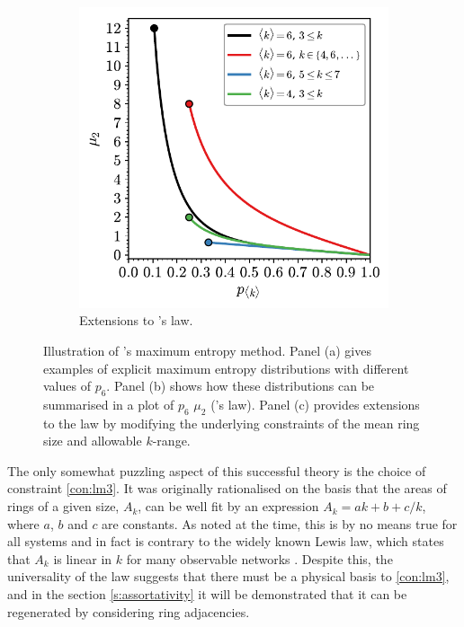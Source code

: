 \begin{figure}[bt]
      \begin{subfigure}[b]{0.45\textwidth}
         \centering
         \includegraphics[width=\textwidth]{./figures/methods/lm_3.pdf}
         \caption{Extensions to \lm's law.}
         \label{fig:lm3}
     \end{subfigure}
     \hfill

    
     \caption{Illustration of \lm's maximum entropy method. Panel (a) gives examples of explicit maximum entropy distributions with different values of $p_6$. Panel (b) shows how these distributions can be summarised in a plot of $p_6$ \vs{} $\mu_2$ (\lm's law). Panel (c) provides extensions to the law by modifying the underlying constraints of the mean ring size and allowable $k$\--range.}
     \label{fig:lm}
\end{figure}

The only somewhat puzzling aspect of this successful theory is the choice of constraint \eqref{con:lm3}.
It was originally rationalised on the basis that the areas of rings of a given size, $A_k$, can be well fit by an expression $A_k = ak+b+c/k$, where $a$, $b$ and $c$ are constants.
As noted at the time, this is by no means true for all systems and in fact is contrary to the widely known Lewis law, which states that $A_k$ is linear in $k$ for many observable networks \cite{Lewis1928,Fortes1995,Kim2014}.
Despite this, the universality of the \lm{} law suggests that there must be a physical basis to \eqref{con:lm3}, and in the section \ref{s:assortativity} it will be demonstrated that it can be regenerated by considering ring adjacencies.

